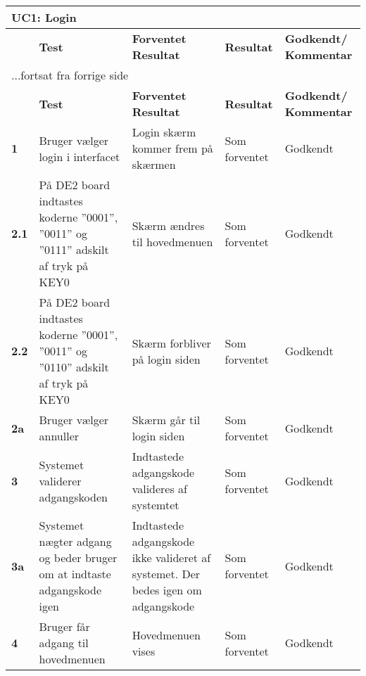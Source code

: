 
\begin{center}
\begin{longtable}{|p{}|p{}|p{}|p{}|p{}|} %
\hline
\multicolumn{5}{|l|}{\textbf{UC1: Login}} \\ \hline
\multicolumn{1}{|c|}{} &
\textbf{Test} &
\textbf{Forventet \newline Resultat} &
\textbf{Resultat} &
\textbf{Godkendt/ \newline Kommentar} \\ \hline 
\endfirsthead

\multicolumn{5}{l}{...fortsat fra forrige side} \\ \hline 
\multicolumn{1}{c|}{} &
\textbf{Test} &
\textbf{Forventet \newline Resultat} &
\textbf{Resultat} &
\textbf{Godkendt/ \newline Kommentar} \\ \hline 
\endhead


\textbf{1}		
&Bruger vælger login i interfacet
&Login skærm kommer frem på skærmen 	
&Som \newline forventet	
&Godkendt \\\hline
\textbf{2.1}		
&På DE2 board indtastes koderne ''0001'', ''0011'' og ''0111'' adskilt af tryk på KEY0 
&Skærm ændres til hovedmenuen
&Som \newline forventet	
&Godkendt \\\hline
\textbf{2.2}		
&På DE2 board indtastes koderne ''0001'', ''0011'' og ''0110'' adskilt af tryk på KEY0 
&Skærm forbliver på login siden	
&Som \newline forventet	
&Godkendt \\\hline
\textbf{2a}		
&Bruger vælger annuller	
&Skærm går til login siden	
&Som \newline forventet	
&Godkendt \\\hline

\textbf{3}		
&Systemet validerer adgangskoden		
&Indtastede adgangskode valideres af systemtet 	
&Som \newline forventet	
&Godkendt \\\hline
\textbf{3a}		
&Systemet nægter adgang og beder bruger om at indtaste adgangskode igen	
&Indtastede adgangskode ikke valideret af systemet. Der bedes igen om adgangskode	
&Som \newline forventet	
&Godkendt \\\hline
\textbf{4}		
&Bruger får adgang til hovedmenuen		
&Hovedmenuen vises
&Som \newline forventet	
&Godkendt \\\hline
	\end{longtable}
	\label{ATUC1} 
\end{center}